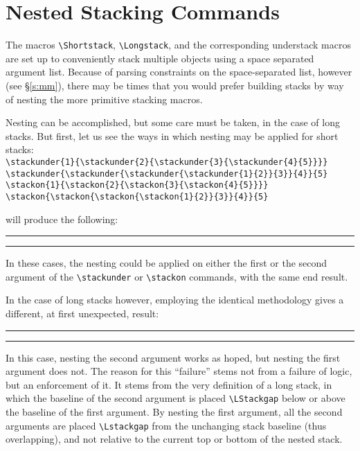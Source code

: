 \documentclass{article}
\def\rl{\rule[-.3pt]{2ex}{.6pt}}
\let\vb\verb
\def\blmark{\rl\stackengine{-.9ex}{B}{\rule{.35ex}{0pt}L}{U}{l}{F}{T}{S}\rl}
\begin{document}
\section{Nested Stacking Commands\label{s:nsc}}

The macros \vb|\Shortstack|, \vb|\Longstack|, and the corresponding
understack macros are set up to conveniently stack multiple objects
using a space separated argument list.  Because of parsing constraints
on the space-separated list, however (see \S\ref{s:mm}), there may be
times that you would prefer building stacks by way of nesting the more
primitive stacking macros.

Nesting can be accomplished, but some care must be taken, in the case of
long stacks.  But first, let us see the ways in which nesting may be
applied for short stacks:\\

\def\stacktype{S}
\vb|\stackunder{1}{\stackunder{2}{\stackunder{3}{\stackunder{4}{5}}}}|\\
\vb|\stackunder{\stackunder{\stackunder{\stackunder{1}{2}}{3}}{4}}{5}|\\
\vb|\stackon{1}{\stackon{2}{\stackon{3}{\stackon{4}{5}}}}|\\
\vb|\stackon{\stackon{\stackon{\stackon{1}{2}}{3}}{4}}{5}|

will produce the following: 
 \blmark

In these cases, the nesting could be applied on either the first or the
second argument of the \vb|\stackunder| or \vb|\stackon| commands,
with the same end result.

In the case of long stacks however, employing the identical methodology
gives a different, at first unexpected, result:
\def\stacktype{L}
 \blmark

In this case, nesting the second argument works as hoped, but nesting
the first argument does not.  The reason for this ``failure'' stems
not from a failure of logic, but an enforcement of it.  It stems from the
very definition of a long stack, in which the baseline of the second
argument is placed \vb|\LStackgap| below or above the baseline of the
first argument.  By nesting the first argument, all the second arguments
are placed \vb|\Lstackgap| from the unchanging stack baseline (thus
overlapping), and not relative to the current top or bottom of the
nested stack.
\end{document}

